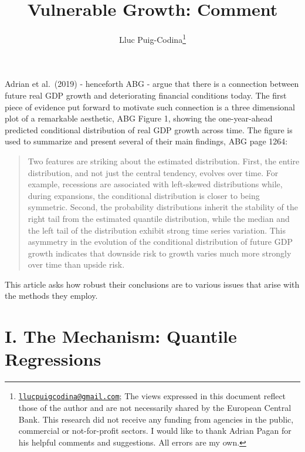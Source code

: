 \documentclass[11pt,]{article}
\title{Vulnerable Growth: Comment}
\author{Lluc Puig-Codina\footnote{\href{mailto:llucpuigcodina@gmail.com}{\nolinkurl{llucpuigcodina@gmail.com}};
  The views expressed in this document reflect those of the author and
  are not necessarily shared by the European Central Bank. This research
  did not receive any funding from agencies in the public, commercial or
  not-for-profit sectors. I would like to thank Adrian Pagan for his
  helpful comments and suggestions. All errors are my own.}}
\date{}
\begin{document}
\maketitle

\newpage


\vspace{0.5cm}

Adrian et al.~(2019) - henceforth ABG - argue that there is a connection
between future real GDP growth and deteriorating financial conditions
today. The first piece of evidence put forward to motivate such
connection is a three dimensional plot of a remarkable aesthetic, ABG
Figure 1, showing the one-year-ahead predicted conditional distribution
of real GDP growth across time. The figure is used to summarize and
present several of their main findings, ABG page 1264:

\begin{quote}
Two features are striking about the estimated distribution. First, the
entire distribution, and not just the central tendency, evolves over
time. For example, recessions are associated with left-skewed
distributions while, during expansions, the conditional distribution is
closer to being symmetric. Second, the probability distributions inherit
the stability of the right tail from the estimated quantile
distribution, while the median and the left tail of the distribution
exhibit strong time series variation. This asymmetry in the evolution of
the conditional distribution of future GDP growth indicates that
downside risk to growth varies much more strongly over time than upside
risk.
\end{quote}

This article asks how robust their conclusions are to various issues
that arise with the methods they employ.

\hypertarget{i.-the-mechanism-quantile-regressions}{%
\section{I. The Mechanism: Quantile
Regressions}\label{i.-the-mechanism-quantile-regressions}}
\end{document}
